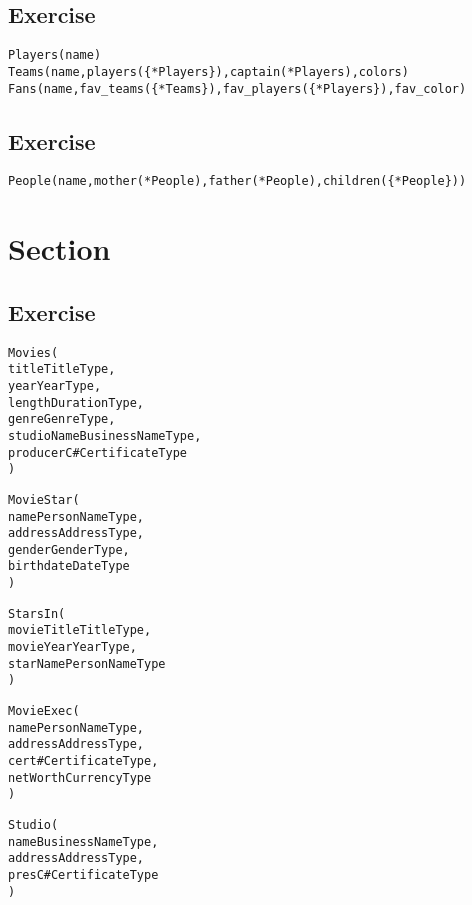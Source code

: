 \setcounter{subsection}{4}
\subsection*{Exercise \thesubsection}
\begin{alltt}
Players(name)
Teams(name, players(\{*Players\}), captain(*Players), colors)
Fans(name, fav_teams(\{*Teams\}), fav_players(\{*Players\}), fav_color)
\end{alltt}

\setcounter{subsection}{5}
\subsection*{Exercise \thesubsection}
\begin{alltt}
People(name, mother(*People), father(*People), children(\{*People\}))
\end{alltt}

\setcounter{section}{4}
\section*{Section \thesection}

\setcounter{subsection}{1}
\subsection*{Exercise \thesubsection}
\begin{alltt}
Movies(
 title       TitleType,
 year        YearType,
 length      DurationType,
 genre       GenreType,
 studioName  BusinessNameType,
 producerC#  CertificateType
)

MovieStar(
 name        PersonNameType,
 address     AddressType,
 gender      GenderType,
 birthdate   DateType
)

StarsIn(
 movieTitle   TitleType,
 movieYear    YearType,
 starName     PersonNameType
)

MovieExec(
 name         PersonNameType,
 address      AddressType,
 cert#        CertificateType,
 netWorth     CurrencyType
)

Studio(
 name         BusinessNameType,
 address      AddressType,
 presC#       CertificateType
)
\end{alltt}


